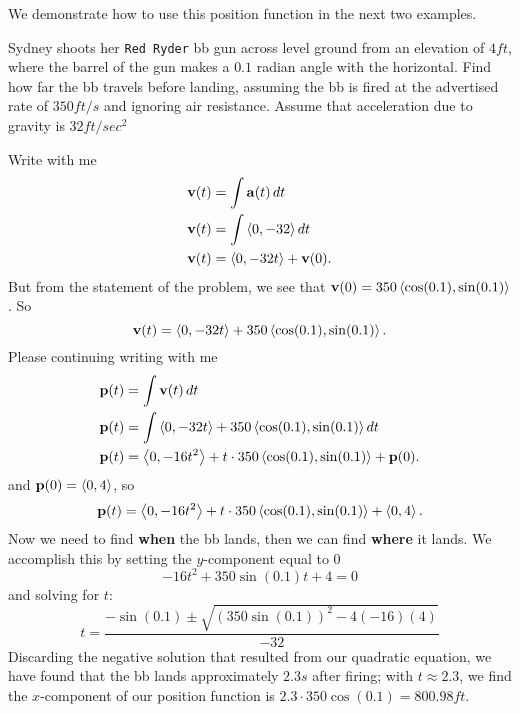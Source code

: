 \documentclass{ximera}
\begin{document}
We demonstrate how to use this position function in the next two
examples.
\begin{example}
Sydney shoots her \texttt{Red Ryder} bb gun across level ground from
an elevation of $4\unit{ft}$, where the barrel of the gun makes a
$0.1$ radian angle with the horizontal. Find how far the bb travels
before landing, assuming the bb is fired at the advertised rate of
$350\unit{ft/s}$ and ignoring air resistance. Assume that acceleration
due to gravity is $32\unit{ft/sec^2}$
\begin{explanation}
  Write with me
  \begin{align*}
    \mathbf{v}(t) &= \int \mathbf{a}(t) \mathop{}\!d t\\
    \mathbf{v}(t) &= \int \left\langle 0,-32\right\rangle \mathop{}\!d t\\
    \mathbf{v}(t) &= \left\langle 0,-32t\right\rangle + \mathbf{v}(0).
  \end{align*}
  But from the statement of the problem, we see that $\mathbf{v}(0) =
  350\left\langle \cos(0.1),\sin(0.1)\right\rangle$. So
  \[
  \mathbf{v}(t) = \left\langle 0,-32t\right\rangle+ 350\left\langle \cos(0.1),\sin(0.1)\right\rangle.
  \]
  Please continuing writing with me
  \begin{align*}
    \mathbf{p}(t) &= \int \mathbf{v}(t)\mathop{}\!d t \\
    \mathbf{p}(t) &= \int \left\langle 0,-32t\right\rangle + 350\left\langle \cos(0.1),\sin(0.1)\right\rangle\mathop{}\!d t\\
    \mathbf{p}(t) &= \left\langle 0,-16t^2\right\rangle +t\cdot 350\left\langle \cos(0.1),\sin(0.1)\right\rangle+ \mathbf{p}(0).
  \end{align*}
  and $\mathbf{p}(0) = \left\langle 0,4\right\rangle$, so
  \[
  \mathbf{p}(t) = \left\langle 0,-16t^2\right\rangle +t\cdot 350\left\langle \cos(0.1),\sin(0.1)\right\rangle+ \left\langle 0,4\right\rangle.
  \]
  Now we need to find \textbf{when} the bb lands, then we can find
  \textbf{where} it lands. We accomplish this by setting the
  $y$-component equal to $0$ 
  \[
  -16t^2+350\sin(0.1)t+4 = 0
  \]
  and solving for $t$:
  \[
  t = \frac{-\sin(0.1) \pm \sqrt{(350\sin(0.1))^2-4(-16)(4)}}{-32}
  \]
Discarding the negative solution that resulted from our quadratic
equation, we have found that the bb lands approximately
$2.3\unit{s}$ after firing; with $t\approx 2.3$, we find the
$x$-component of our position function is $2.3\cdot 350\cos(0.1) =
  800.98\unit{ft}$. 
\end{explanation}
\end{example}
\end{document}
